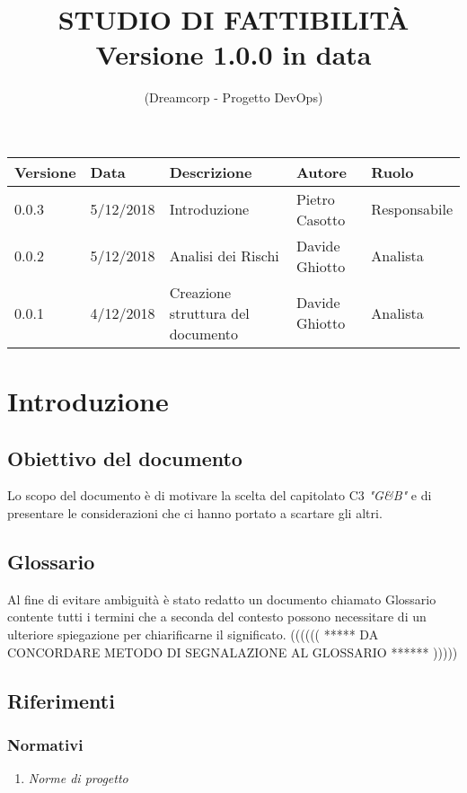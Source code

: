 \documentclass{article}
\title{\textbf{STUDIO DI FATTIBILITÀ}
\\{\Large Versione 1.0.0 in data }}
\author{(Dreamcorp - Progetto DevOps)}
\begin{document}
\maketitle



\begin{tabularx}{\textwidth}{|X|X|X|X|X|}
	\hline
	\textbf{Versione} & \textbf{Data} & \textbf{Descrizione} & \textbf{Autore} & \textbf{Ruolo}\\
	\hline
	0.0.3 & 5/12/2018 & Introduzione & Pietro Casotto & Responsabile \\
	\hline
	0.0.2 & 5/12/2018 & Analisi dei Rischi & Davide Ghiotto & Analista \\
	\hline
	0.0.1 & 4/12/2018 & Creazione struttura del documento & Davide Ghiotto & Analista  \\
	\hline
\end{tabularx}
\newpage

\section{Introduzione}
	\subsection{Obiettivo del documento}
		Lo scopo del documento è di motivare la scelta del capitolato C3 \textit{"G\&B"} e di presentare le considerazioni che ci hanno portato a scartare gli altri.
	\subsection{Glossario}
		Al fine di evitare ambiguità è stato redatto un documento chiamato Glossario contente tutti i termini che a seconda del contesto possono necessitare di un ulteriore spiegazione per chiarificarne il significato. ((((((  *****   DA CONCORDARE METODO DI SEGNALAZIONE AL GLOSSARIO ******   ))))) 
	\subsection{Riferimenti}
		\subsubsection{Normativi}
			\begin{enumerate}
				\item \textit{Norme di progetto}
			\end{enumerate}
\end{document}
